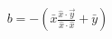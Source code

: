\documentclass[preview]{standalone}
\begin{document}
\begin{align*}
b = -( \bar{x} \frac{\hat{x}\cdot\overrightarrow{y}}{\hat{x}\cdot\hat{x}} + \bar{y} )
\end{align*}
\end{document}

